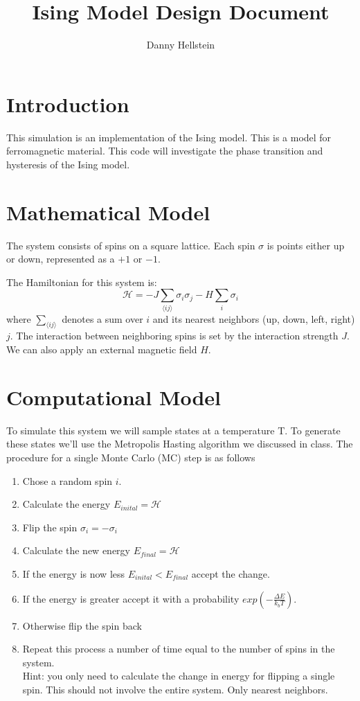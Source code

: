 \documentclass[]{scrartcl}
\title{Ising Model Design Document}
\author{Danny Hellstein}
\begin{document}
\maketitle

\section{Introduction}
This simulation is an implementation of the Ising model. This is a model for ferromagnetic material. This code will investigate the phase transition and hysteresis of the Ising model.

\section{Mathematical Model}
The system consists of spins on a square lattice. Each spin $\sigma$ is points either up or down, represented as a $+1$ or $-1$. 

The Hamiltonian for this system is:
$$\mathcal{H} = -J\sum_{\langle ij\rangle}\sigma_i\sigma_j - H\sum_i \sigma_i$$
where $\displaystyle\sum_{\langle ij\rangle}$ denotes a sum over $i$ and its nearest neighbors (up, down, left, right) $j$. The interaction between neighboring spins is set by the interaction strength $J$. We can also apply an external magnetic field $H$.

\section{Computational Model}
		To simulate this system we will sample states at a temperature T. To generate these states we'll use the Metropolis Hasting algorithm we discussed in class. The procedure for a single Monte Carlo (MC) step is as follows
\begin{enumerate}
	\item Chose a random spin $i$.
	\item Calculate the energy $E_{inital} = \mathcal{H}$
	\item Flip the spin $\sigma_i = -\sigma_i$
	\item Calculate the new energy $E_{final} = \mathcal{H}$
	\item If the energy is now less $E_{inital}<E_{final}$ accept the change.
	\item If the energy is greater accept it with a probability $exp(-\frac{\Delta E}{k_b T})$.
	\item Otherwise flip the spin back
	\item Repeat this process a number of time equal to the number of spins in the system.\\
	Hint: you only need to calculate the change in energy for flipping a single spin. This should not involve the entire system. Only nearest neighbors.
	
\end{enumerate}
\end{document}
